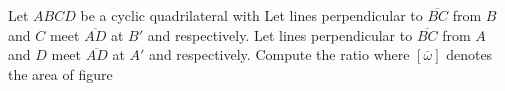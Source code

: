 Let $ABCD$ be a cyclic quadrilateral with     Let lines perpendicular to $\overline{BC}$ from $B$ and $C$ meet $\overline{AD}$ at $B'$ and  respectively. Let lines perpendicular to $\overline{BC}$ from $A$ and $D$ meet $\overline{AD}$ at $A'$ and  respectively. Compute the ratio  where $[\overline{\omega}]$ denotes the area of figure 